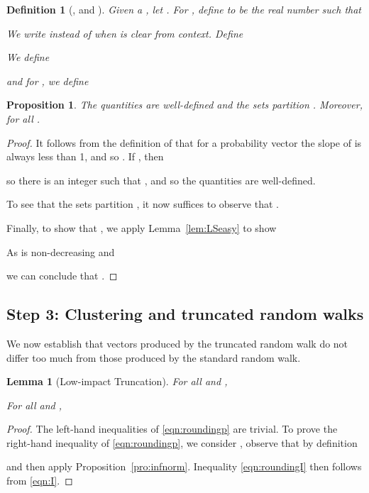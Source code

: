 \documentclass[11pt]{article}
\newtheorem{lemma}[theorem]{Lemma}
\newtheorem{proposition}[theorem]{Proposition}
\newtheorem{definition}[theorem]{Definition}
\begin{document}
\begin{definition}[,  and ]\label{def:Sgb}
Given a , let .
For ,
  define  to be the real number such that

We write  instead of  when  is clear from context.
Define

We define

and for , we define

\end{definition}

\begin{proposition}\label{pro:Sgb}
The quantities  are well-defined and
  the sets  partition .
Moreover,  for all .
\end{proposition}
\begin{proof}
It follows from the definition of
   that 
  for a probability vector  the slope of 
  is always less than 1, and so
  .
If ,
  then 

  so there is an integer  such that
  , and so the quantities  are well-defined.

To see that the sets  partition , it now suffices to
  observe that .

Finally, to show that ,
  we apply Lemma~\ref{lem:LSeasy} to show

As  is non-decreasing
  and

we can conclude that .
\end{proof}


\subsection*{Step 3: Clustering and truncated random walks}


We now establish that vectors produced by the
  truncated random walk do not differ too much from those
  produced by the standard random walk.
\begin{lemma}[Low-impact Truncation]\label{lem:rounding}
For all  and ,

For all  and ,

\end{lemma}
\begin{proof}
The left-hand inequalities of \eqref{eqn:roundingp} are trivial.
To prove the right-hand inequality of \eqref{eqn:roundingp}, we consider
  , observe that by definition

and then apply Proposition~\ref{pro:infnorm}.
Inequality \eqref{eqn:roundingI} then
  follows from \eqref{eqn:I}.
\end{proof}
\end{document}
